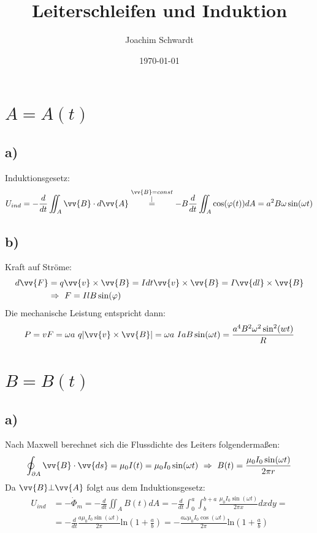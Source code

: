 \documentclass[a4paper,12pt]{article}
\begin{document}
\title{Leiterschleifen und Induktion}
\author{Joachim Schwardt}
\date{\today}
\maketitle

\section{$A=A(t)$}
\subsection*{a)}
Induktionsgesetz: 
\begin{align*}
U_{ind}=-\frac{d}{dt}\iint_A \vv{B}\cdot d\vv{A} \overset{\substack{ \vv{B}=const\\|}}{=}-B\frac{d}{dt}\iint_A \cos(\varphi(t))dA = a^2B\omega\sin(\omega t)
\end{align*}
\subsection*{b)} Kraft auf Ströme:
\begin{align*}
d\vv{F}&=q\vv{v}\times\vv{B}=Idt\vv{v}\times\vv{B}=I\vv{dl}\times\vv{B}\\
&\Rightarrow\ F = IlB\sin(\varphi)
\end{align*}
Die mechanische Leistung entspricht dann:
\begin{align*}
P = vF = \omega a\ q|\vv{v}\times\vv{B}|=\omega a\ IaB\sin(\omega t)=\frac{a^4B^2\omega^2\sin^2(wt)}{R}
\end{align*} 
\section{$B = B(t)$}
\subsection*{a)}
Nach Maxwell berechnet sich die Flussdichte des Leiters folgendermaßen:
\begin{align*}
\oint_{\partial A} \vv{B}\cdot\vv{ds} = \mu_0I(t) = \mu_0I_0\sin(\omega t)\ \Rightarrow\ B(t) = \frac{\mu_0I_0\sin(\omega t)}{2\pi r}
\end{align*}
Da $\vv{B}\bot\vv{A}$ folgt aus dem Induktionsgesetz:
\begin{align*}
U_{ind}&=-\dot{\Phi}_m = -\frac{d}{dt}\iint_A B(t)dA = -\frac{d}{dt}\int_0^{a}\int_b^{b+a} \frac{\mu_0I_0\sin(\omega t)}{2\pi x} dxdy=\\
&=-\frac{d}{dt}\frac{a\mu_0I_0\sin(\omega t)}{2\pi}\mathrm{ln}\left(1+\frac{a}{b}\right) = -\frac{a\omega\mu_0I_0\cos(\omega t)}{2\pi}\mathrm{ln}\left(1+\frac{a}{b}\right)
\end{align*}
\end{document}
